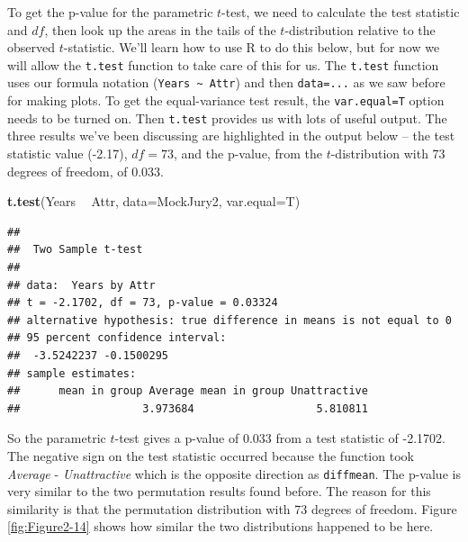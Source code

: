 \documentclass[]{book}
\newenvironment{Shaded}{\begin{snugshade}}{\end{snugshade}}
\newcommand{\KeywordTok}[1]{\textcolor[rgb]{0.13,0.29,0.53}{\textbf{#1}}}
\newcommand{\DataTypeTok}[1]{\textcolor[rgb]{0.13,0.29,0.53}{#1}}
\newcommand{\StringTok}[1]{\textcolor[rgb]{0.31,0.60,0.02}{#1}}
\newcommand{\OperatorTok}[1]{\textcolor[rgb]{0.81,0.36,0.00}{\textbf{#1}}}
\newcommand{\NormalTok}[1]{#1}
\theoremstyle{definition}
\theoremstyle{definition}
\theoremstyle{remark}
\begin{document}
To get the p-value for the parametric \(t\)-test, we need to calculate
the test statistic and \(df\), then look up the areas in the tails of
the \(t\)-distribution relative to the observed \(t\)-statistic. We'll
learn how to use R to do this below, but for now we will allow the
\texttt{t.test} function to take care of this for us. The
\texttt{t.test} function uses our formula notation
(\texttt{Years\ \textasciitilde{}\ Attr}) and then \texttt{data=...} as
we saw before for making plots. To get the equal-variance test result,
the \texttt{var.equal=T} option needs to be turned on. Then
\texttt{t.test} provides us with lots of useful output. The three
results we've been discussing are highlighted in the output below -- the
test statistic value (-2.17), \(df=73\), and the p-value, from the
\(t\)-distribution with 73 degrees of freedom, of 0.033.

\begin{Shaded}
\begin{Highlighting}[]
\KeywordTok{t.test}\NormalTok{(Years }\OperatorTok{~}\StringTok{ }\NormalTok{Attr, }\DataTypeTok{data=}\NormalTok{MockJury2, }\DataTypeTok{var.equal=}\NormalTok{T)}
\end{Highlighting}
\end{Shaded}

\begin{verbatim}
## 
##  Two Sample t-test
## 
## data:  Years by Attr
## t = -2.1702, df = 73, p-value = 0.03324
## alternative hypothesis: true difference in means is not equal to 0
## 95 percent confidence interval:
##  -3.5242237 -0.1500295
## sample estimates:
##      mean in group Average mean in group Unattractive 
##                   3.973684                   5.810811
\end{verbatim}

So the parametric \(t\)-test gives a p-value of 0.033 from a test
statistic of -2.1702. The negative sign on the test statistic occurred
because the function took \emph{Average} - \emph{Unattractive} which is
the opposite direction as \texttt{diffmean}. The p-value is very similar
to the two permutation results found before. The reason for this
similarity is that the permutation distribution with 73 degrees of
freedom. Figure \ref{fig:Figure2-14} shows how similar the two
distributions happened to be here.
\end{document}
